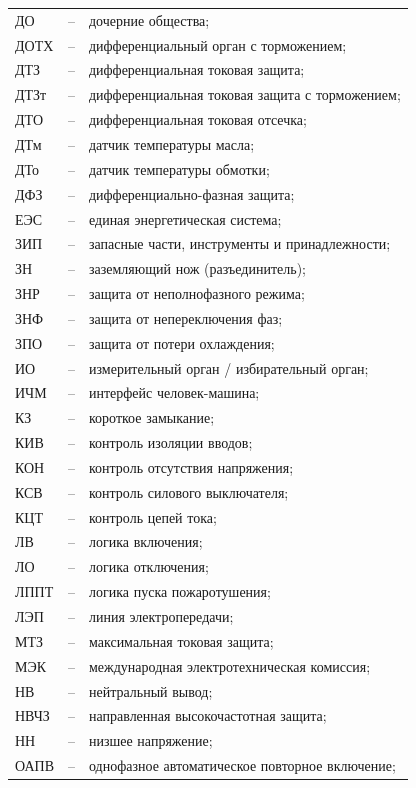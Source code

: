 \begin{longtable}{>{\raggedright\arraybackslash}m{2cm}>{\raggedright\arraybackslash}m{0.5cm}>{\raggedright\arraybackslash}m{20cm}}
ДО & -- & дочерние общества; \\
ДОТХ & -- & дифференциальный орган с торможением; \\
ДТЗ & -- & дифференциальная токовая защита; \\
ДТЗт & -- & дифференциальная токовая защита с торможением; \\
ДТО & -- & дифференциальная токовая отсечка; \\
ДТм & -- & датчик температуры масла; \\
ДТо & -- & датчик температуры обмотки; \\
ДФЗ & -- & дифференциально-фазная защита; \\
ЕЭС & -- & единая энергетическая система; \\
ЗИП & -- & запасные части, инструменты и принадлежности; \\
ЗН & -- & заземляющий нож (разъединитель); \\
ЗНР & -- & защита от неполнофазного режима; \\
ЗНФ & -- & защита от непереключения фаз; \\
ЗПО & -- & защита от потери охлаждения; \\
ИО & -- & измерительный орган / избирательный орган; \\
ИЧМ & -- & интерфейс человек-машина; \\
КЗ & -- & короткое замыкание; \\
КИВ & -- & контроль изоляции вводов; \\
КОН & -- & контроль отсутствия напряжения; \\
КСВ & -- & контроль силового выключателя; \\
КЦТ & -- & контроль цепей тока; \\
ЛВ & -- & логика включения; \\
ЛО & -- & логика отключения; \\
ЛППТ & -- & логика пуска пожаротушения; \\
ЛЭП & -- & линия электропередачи; \\
МТЗ & -- & максимальная токовая защита; \\
МЭК & -- & международная электротехническая комиссия; \\
НВ & -- & нейтральный вывод; \\
НВЧЗ & -- & направленная высокочастотная защита; \\
НН & -- & низшее напряжение; \\
ОАПВ & -- & однофазное автоматическое повторное включение; \\

\end{longtable}
